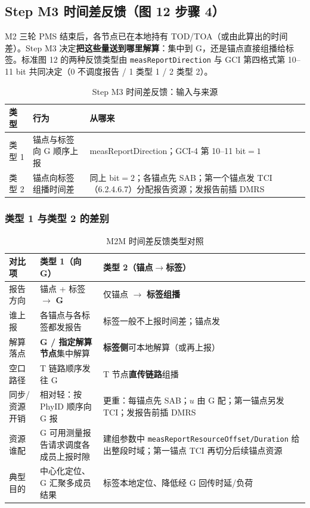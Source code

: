 \documentclass[11pt,a4paper]{ctexart}
\begin{document}
\subsection{Step M3 时间差反馈（图 12 步骤 4）}

M2 三轮 PMS 结束后，各节点已在本地持有 TOD/TOA（或由此算出的时间差）。Step M3 决定\textbf{把这些量送到哪里解算}：集中到 G，还是锚点直接组播给标签。标准图 12 的两种反馈类型由 \texttt{measReportDirection} 与 GCI 第四格式第 10--11 bit 共同决定（0 不调度报告 / 1 类型 1 / 2 类型 2）。

\begin{longtable}{L{2cm}L{5cm}L{5.5cm}}
\caption{Step M3 时间差反馈：输入与来源\label{tab:step107}} \\
\toprule
\textbf{类型} & \textbf{行为} & \textbf{从哪来} \\
\midrule
类型 1 & 锚点与标签向 G 顺序上报 & measReportDirection；GCI-4 第 10--11 bit$=1$ \\
类型 2 & 锚点向标签组播时间差 & 同上 bit$=2$；各锚点先 SAB；第一个锚点发 TCI（6.2.4.6.7）分配报告资源；发报告前插 DMRS \\
\bottomrule
\end{longtable}

\subsubsection{类型 1 与类型 2 的差别}

\begin{longtable}{L{2.4cm}L{5.5cm}L{5.5cm}}
\caption{M2M 时间差反馈类型对照\label{tab:step108}} \\
\toprule
\textbf{对比项} & \textbf{类型 1（向 G）} & \textbf{类型 2（锚点$\to$标签）} \\
\midrule
报告方向 & 锚点 + 标签 $\rightarrow$ \textbf{G} & 仅锚点 $\rightarrow$ \textbf{标签组播} \\
谁上报 & 各锚点与各标签都发报告 & 标签一般不上报时间差；锚点发 \\
解算落点 & \textbf{G / 指定解算节点}集中解算 & \textbf{标签侧}可本地解算（或再上报） \\
空口路径 & T 链路顺序发往 G & T 节点\textbf{直传链路}组播 \\
同步/资源开销 & 相对轻：按 PhyID 顺序向 G 报 & 更重：每锚点先 SAB；$u$ 由 G 配；第一锚点另发 TCI；发报告前插 DMRS \\
资源谁配 & G 可用测量报告请求调度各成员上报时隙 & 建组参数中 \texttt{measReportResourceOffset/Duration} 给出整段时域；第一锚点 TCI 再切分后续锚点资源 \\
典型目的 & 中心化定位、G 汇聚多成员结果 & 标签本地定位、降低经 G 回传时延/负荷 \\
\bottomrule
\end{longtable}
\end{document}
